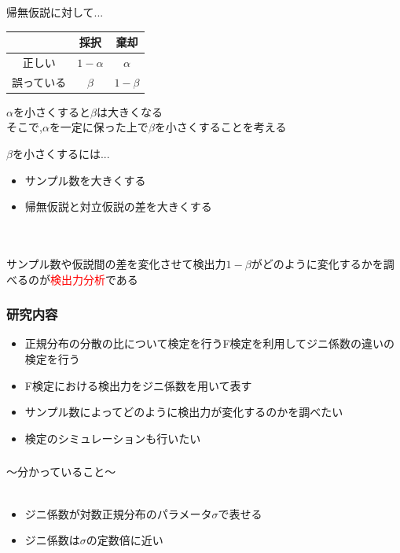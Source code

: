 \documentclass[dvipdfmx,14pt]{beamer}
\begin{document}
\begin{frame}
帰無仮説に対して...
\begin{center}
\begin{tabular}{|c|c|c|} \hline
 & 採択 & 棄却 \\ \hline
 正しい & $ 1-\alpha $ & $ \alpha $ \\ \hline
 誤っている & $ \beta $ & $ 1-\beta $ \\ \hline
\end{tabular}
\end{center}
$ \alpha $を小さくすると$ \beta $は大きくなる \\
そこで,$ \alpha $を一定に保った上で$ \beta $を小さくすることを考える
\end{frame}

\begin{frame}
$ \beta $を小さくするには...
\begin{itemize}
 \item サンプル数を大きくする
 \item 帰無仮説と対立仮説の差を大きくする
\end{itemize}
\ \\ \ \\
サンプル数や仮説間の差を変化させて検出力$ 1-\beta $がどのように変化するかを調べるのが\textcolor{red}{検出力分析}である
\end{frame}

\begin{frame}
\frametitle{研究内容}
\begin{itemize}
 \item 正規分布の分散の比について検定を行うF検定を利用してジニ係数の違いの検定を行う
 \item F検定における検出力をジニ係数を用いて表す
 \item サンプル数によってどのように検出力が変化するのかを調べたい
 \item 検定のシミュレーションも行いたい
\end{itemize}
\end{frame}

\begin{frame}
\frametitle{}
{\large ～分かっていること～}
\\ \ \\
\begin{itemize}
 \item ジニ係数が対数正規分布のパラメータ$\sigma $で表せる
 \item ジニ係数は$\sigma $の定数倍に近い
\end{itemize}
\end{frame}
\end{document}
